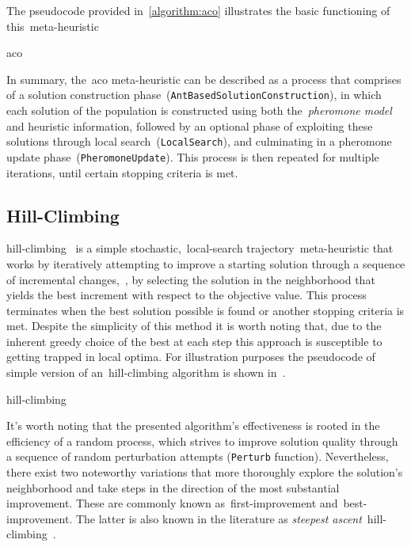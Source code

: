 The pseudocode provided in~\ref{algorithm:aco} illustrates the basic functioning
of this~\acrshort{meta-heuristic}

\begin{algorithm}
  
  \caption{\acrlong{aco}}
  \label{algorithm:aco}
\end{algorithm}

In summary, the~\acrshort{aco} meta-heuristic can be described as a process that
comprises of a solution construction
phase~(\texttt{AntBasedSolutionConstruction}), in which each solution
of the population is constructed using both the~\textit{pheromone model} and
heuristic information, followed by an optional phase of exploiting these
solutions through local search~(\texttt{LocalSearch}), and culminating
in a pheromone update phase~(\texttt{PheromoneUpdate}). This process is
then repeated for multiple iterations, until certain stopping criteria is met.

\subsection{Hill-Climbing}
\label{subsec:hill-climbing}

\acrfull{hill-climbing}~\cite{luke2013essentialsa,vieira2009uma} is a simple
stochastic,~\acrshort{local-search} trajectory~\acrshort{meta-heuristic} that
works by iteratively attempting to improve a starting solution through a
sequence of incremental changes,~\ie{}, by selecting the solution in the
neighborhood that yields the best increment with respect to the objective value.
This process terminates when the best solution possible is found or another
stopping criteria is met. Despite the simplicity of this method it is worth
noting that, due to the inherent greedy choice of the best at each step this
approach is susceptible to getting trapped in local optima. For illustration
purposes the pseudocode of simple version of an~\acrshort{hill-climbing}
algorithm is shown in~.

\begin{algorithm}
  
  \caption{\acrlong{hill-climbing}}
  \label{algorithm:hill-climbing}
\end{algorithm}

It's worth noting that the presented algorithm's effectiveness is rooted in the
efficiency of a random process, which strives to improve solution quality
through a sequence of random perturbation attempts (\texttt{Perturb} function).
Nevertheless, there exist two noteworthy variations that more thoroughly explore
the solution's neighborhood and take steps in the direction of the most
substantial improvement. These are commonly known as~\acrfull{first-improvement}
and~\acrfull{best-improvement}. The latter is also known in the literature as
\textit{steepest ascent}~\acrshort{hill-climbing}~\cite{luke2013essentialsa}.

